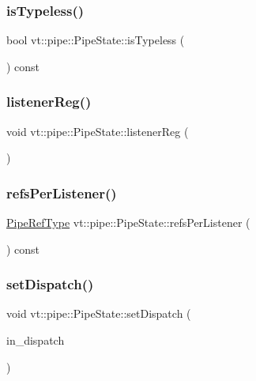 \subsubsection{\texorpdfstring{is\+Typeless()}{isTypeless()}}
{\footnotesize\ttfamily bool vt\+::pipe\+::\+Pipe\+State\+::is\+Typeless (\begin{DoxyParamCaption}{ }\end{DoxyParamCaption}) const}

\mbox{\label{structvt_1_1pipe_1_1_pipe_state_acfbe1dc3cac73153543a394b4f8add35}} 
\subsubsection{\texorpdfstring{listener\+Reg()}{listenerReg()}}
{\footnotesize\ttfamily void vt\+::pipe\+::\+Pipe\+State\+::listener\+Reg (\begin{DoxyParamCaption}{ }\end{DoxyParamCaption})}

\mbox{\label{structvt_1_1pipe_1_1_pipe_state_ad7ec2850c900f8359affd00af6d7e0cc}} 
\subsubsection{\texorpdfstring{refs\+Per\+Listener()}{refsPerListener()}}
{\footnotesize\ttfamily \hyperlink{namespacevt_ace18d74dd489d9ea506d38789fffce34}{Pipe\+Ref\+Type} vt\+::pipe\+::\+Pipe\+State\+::refs\+Per\+Listener (\begin{DoxyParamCaption}{ }\end{DoxyParamCaption}) const}

\mbox{\label{structvt_1_1pipe_1_1_pipe_state_a436083ce72366f0bece034065bb3aca1}} 
\subsubsection{\texorpdfstring{set\+Dispatch()}{setDispatch()}}
{\footnotesize\ttfamily void vt\+::pipe\+::\+Pipe\+State\+::set\+Dispatch (\begin{DoxyParamCaption}\item[{\hyperlink{structvt_1_1pipe_1_1_pipe_state_ad81b637847d9c3185420c58c9272ed7d}{Dispatch\+Func\+Type}}]{in\+\_\+dispatch }\end{DoxyParamCaption})}

